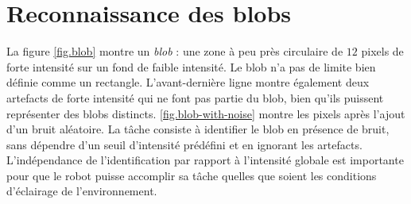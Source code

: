 \section{Reconnaissance des blobs}\label{s.blob}

La figure \ref{fig.blob} montre un \emph{blob} : une zone à peu près circulaire de $12$ pixels de forte intensité sur un fond de faible intensité. Le blob n'a pas de limite bien définie comme un rectangle. L'avant-dernière ligne montre également deux artefacts de forte intensité qui ne font pas partie du blob, bien qu'ils puissent représenter des blobs distincts. \ref{fig.blob-with-noise} montre les pixels après l'ajout d'un bruit aléatoire. La tâche consiste à identifier le blob en présence de bruit, sans dépendre d'un seuil d'intensité prédéfini et en ignorant les artefacts. L'indépendance de l'identification par rapport à l'intensité globale est importante pour que le robot puisse accomplir sa tâche quelles que soient les conditions d'éclairage de l'environnement.


